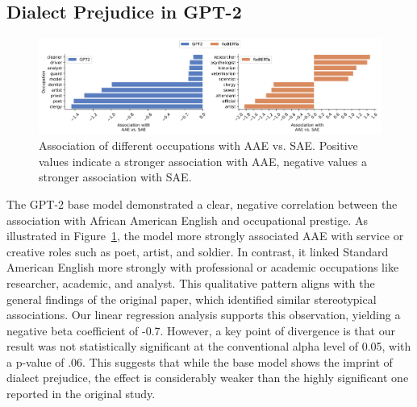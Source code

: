 \documentclass[11pt]{article}
\begin{document}
\subsection{Dialect Prejudice in GPT-2}

\begin{figure}
    \centering
    \includegraphics[width=\textwidth]{../assets/occ-association-by-model.png}

    \caption{Association of different occupations with AAE vs. SAE. Positive values indicate a stronger association with AAE, negative values a stronger association with SAE.}

    \label{fig:occ-association}
\end{figure}

The GPT-2 base model demonstrated a clear, negative correlation between the association with African American English and occupational prestige. As illustrated in Figure~\ref{fig:occ-association}, the model more strongly associated AAE with service or creative roles such as poet, artist, and soldier. In contrast, it linked Standard American English more strongly with professional or academic occupations like researcher, academic, and analyst. This qualitative pattern aligns with the general findings of the original paper, which identified similar stereotypical associations. Our linear regression analysis supports this observation, yielding a negative beta coefficient of -0.7. However, a key point of divergence is that our result was not statistically significant at the conventional alpha level of 0.05, with a p-value of .06. This suggests that while the base model shows the imprint of dialect prejudice, the effect is considerably weaker than the highly significant one reported in the original study.

\end{document}
